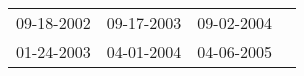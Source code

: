 \begin{supertabular}{llll}
 09-18-2002 &  09-17-2003 &  09-02-2004 \\
 01-24-2003 &  04-01-2004 &  04-06-2005 \\
\end{supertabular}
